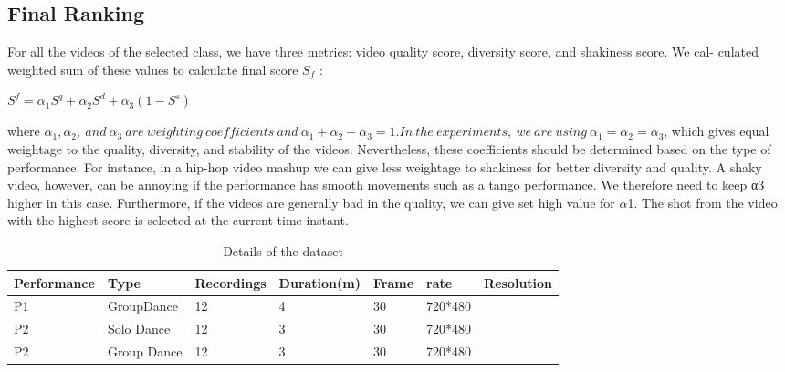 \documentclass{sig-alternate}
\begin{document}
{{{\subsection{Final Ranking}
For all the videos of the selected class, we have three metrics:
video quality score, diversity score, and shakiness score. We cal-
culated weighted sum of these values to calculate final score $S_f$ :
\begin{center}
$S^f = \alpha_1S^q + \alpha_2S^d + \alpha_3(1 − S^s )$
\end{center}

where $\alpha_1 , \alpha_2 ,\ and\ \alpha_3\ are\ weighting\ coefficients\ and\ \alpha_1 + \alpha_2 +
\alpha_3 = 1. In\ the\ experiments,\ we\ are\ using\ \alpha_1 = \alpha_2 = \alpha_3 $, which gives equal weightage to the quality, diversity, and stability of the videos. Nevertheless, these coefficients should be determined based on the type of performance. For instance, in a hip-hop
video mashup we can give less weightage to shakiness for better diversity and quality. A shaky video, however, can be annoying if the performance has smooth movements such as a tango performance.
We therefore need to keep α3 higher in this case. Furthermore, if
the videos are generally bad in the quality, we can give set high
value for $\alpha$1. The shot from the video with the highest score is
selected at the current time instant.

\begin{table}
\centering
\caption{Details of the dataset}
\begin{tabular}{l|l|l|l|l|l} \hline
 Performance&Type &Recordings& Duration(m)&Frame&rate&Resolution\\ \hline
P1&GroupDance&12& 4& 30& 720*480\\ \hline
P2&Solo Dance&12&3 &30 &720*480\\ \hline
P2&Group Dance&12&3 &30 &720*480 \hline
\end{tabular}
\end{table}



}}}
\end{document}
